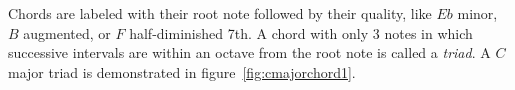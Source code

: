 Chords are labeled with their root note followed by their quality, like $Eb$ minor, $B$ augmented, or $F$ half-diminished 7th. A chord with only 3 notes in which successive intervals are within an octave from the root note is called a \textit{triad}. A $C$ major triad is demonstrated in figure~\ref{fig:cmajorchord1}.



